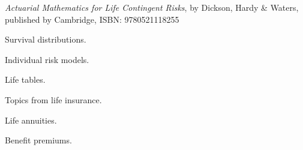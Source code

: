 \documentclass{osucourse}
\begin{document}
\CatalogDescription
\PrerequisitesAndExclusions

\begin{Text}
\emph{Actuarial Mathematics for Life Contingent Risks}, by Dickson, Hardy \& Waters, published by Cambridge, ISBN: 9780521118255
\end{Text}

\begin{TopicsList}
\item Survival distributions.
\item Individual risk models.
\item Life tables.
\item Topics from life insurance.
\item Life annuities.
\item Benefit premiums.
\end{TopicsList}
\end{document}
